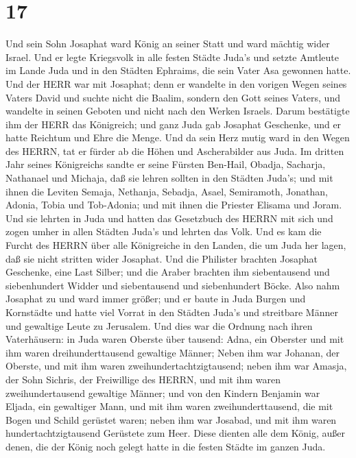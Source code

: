 \hypertarget{section-16}{%
\section{17}\label{section-16}}

 Und sein Sohn Josaphat ward König an seiner Statt und ward
mächtig wider Israel.  Und er legte Kriegsvolk in alle
festen Städte Juda's und setzte Amtleute im Lande Juda und in den
Städten Ephraims, die sein Vater Asa gewonnen hatte.  Und
der HERR war mit Josaphat; denn er wandelte in den vorigen Wegen seines
Vaters David und suchte nicht die Baalim,  sondern den Gott
seines Vaters, und wandelte in seinen Geboten und nicht nach den Werken
Israels.  Darum bestätigte ihm der HERR das Königreich; und
ganz Juda gab Josaphat Geschenke, und er hatte Reichtum und Ehre die
Menge.  Und da sein Herz mutig ward in den Wegen des HERRN,
tat er fürder ab die Höhen und Ascherabilder aus Juda.  Im
dritten Jahr seines Königreichs sandte er seine Fürsten Ben-Hail,
Obadja, Sacharja, Nathanael und Michaja, daß sie lehren sollten in den
Städten Juda's;  und mit ihnen die Leviten Semaja, Nethanja,
Sebadja, Asael, Semiramoth, Jonathan, Adonia, Tobia und Tob-Adonia; und
mit ihnen die Priester Elisama und Joram.  Und sie lehrten
in Juda und hatten das Gesetzbuch des HERRN mit sich und zogen umher in
allen Städten Juda's und lehrten das Volk.  Und es kam die
Furcht des HERRN über alle Königreiche in den Landen, die um Juda her
lagen, daß sie nicht stritten wider Josaphat.  Und die
Philister brachten Josaphat Geschenke, eine Last Silber; und die Araber
brachten ihm siebentausend und siebenhundert Widder und siebentausend
und siebenhundert Böcke.  Also nahm Josaphat zu und ward
immer größer; und er baute in Juda Burgen und Kornstädte 
und hatte viel Vorrat in den Städten Juda's und streitbare Männer und
gewaltige Leute zu Jerusalem.  Und dies war die Ordnung
nach ihren Vaterhäusern: in Juda waren Oberste über tausend: Adna, ein
Oberster und mit ihm waren dreihunderttausend gewaltige Männer;
 Neben ihm war Johanan, der Oberste, und mit ihm waren
zweihundertachtzigtausend;  neben ihm war Amasja, der Sohn
Sichris, der Freiwillige des HERRN, und mit ihm waren zweihundertausend
gewaltige Männer;  und von den Kindern Benjamin war Eljada,
ein gewaltiger Mann, und mit ihm waren zweihunderttausend, die mit Bogen
und Schild gerüstet waren;  neben ihm war Josabad, und mit
ihm waren hundertachtzigtausend Gerüstete zum Heer.  Diese
dienten alle dem König, außer denen, die der König noch gelegt hatte in
die festen Städte im ganzen Juda.

